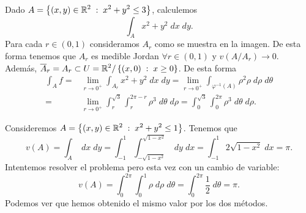 \begin{eg}
	Dado $\displaystyle A = \left\{ \left(x,y\right)\in \mathbb{R}^{2} \; : \; x^{2}+y^{2} \leq 3\right\}  $, calculemos 
	\[\int _{A}x^{2}+y^{2} \; dx \; dy .\]
	Para cada $\displaystyle r \in \left(0,1\right) $ consideramos $\displaystyle A_{r} $ como se muestra en la imagen.
	De esta forma tenemos que $\displaystyle A_{r} $ es medible Jordan $\displaystyle \forall r \in \left(0,1\right) $ y $\displaystyle v\left(A/A_{r}\right)\to 0 $. Además, $\displaystyle \overline{A}_{r}=A_{r}\subset U = \mathbb{R}^{2}/ \left\{ \left(x,0\right) \; : \; x \geq 0\right\} $. De esta forma
\[
\begin{split}
	\int _{A}f = &\lim_{r \to 0^{+}}\int _{A_{r}}x^{2}+y^{2} \; dx \; dy = \lim_{r \to 0^{+}}\int _{\varphi^{-1}\left(A\right)}\rho^{2}\rho \; d\rho \; d\theta \\
	= & \lim_{r \to 0^{+}}\int^{\sqrt{3}}_{r}\int^{2\pi - r}_{r} \rho^{3} \; d\theta   \; d\rho = \int^{\sqrt{3}}_{0} \int^{2\pi }_{0} \rho^{3} \; d\theta  \; d\rho.
\end{split}
\]
\end{eg}
\begin{eg}
	Consideremos $\displaystyle A = \left\{ \left(x,y\right) \in \mathbb{R}^{2} \; : \; x^{2} +y^{2}\leq 1\right\}  $. Tenemos que 
	\[v\left(A\right)=\int _{A} \; dx\; dy = \int^{1}_{-1} \int^{\sqrt{1-x^{2}}}_{-\sqrt{1-x^{2}}}  \; dy \; dx = \int^{1}_{-1} 2\sqrt{1-x^{2}} \; dx=\pi .\]
Intentemos resolver el problema pero esta vez con un cambio de variable:
\[v\left(A\right) = \int^{2\pi }_{0} \int^{1}_{0} \rho \; d\rho \; d\theta=\int^{2\pi }_{0} \frac{1}{2} \; d\theta = \pi .\]
Podemos ver que hemos obtenido el mismo valor por los dos métodos.
\end{eg}

